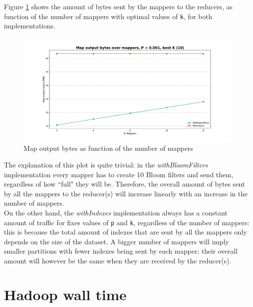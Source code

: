 Figure \ref{fig:MapOutputBytesMappers} shows the amount of bytes sent by the mappers to the reducers, as function of the number of mappers with optimal values of \texttt{k}, for both implementations.\\

\begin{figure}[H]
    \begin{center}
        \includegraphics[scale=.45,trim={3cm 0 3cm 0},clip]{img/MapOutputBytesMappers.pdf}
    \end{center}
    \vspace*{-0.5cm}
    \caption{Map output bytes as function of the number of mappers}
    \label{fig:MapOutputBytesMappers}
\end{figure}

\noindent The explanation of this plot is quite trivial: in the \textit{withBloomFilters} implementation every mapper has to create 10 Bloom filters and send them, regardless of how ``full" they will be. Therefore, the overall amount of bytes sent by all the mappers to the reducer(s) will increase linearly with an increase in the number of mappers.\\
On the other hand, the \textit{withIndexes} implementation always has a constant amount of traffic for fixes values of \texttt{p} and \texttt{k}, regardless of the number of mappers: this is because the total amount of indexes that are sent by all the mappers only depends on the size of the dataset. A bigger number of mappers will imply smaller partitions with fewer indexes being sent by each mapper; their overall amount will however be the same when they are received by the reducer(s).

\section{Hadoop wall time}

